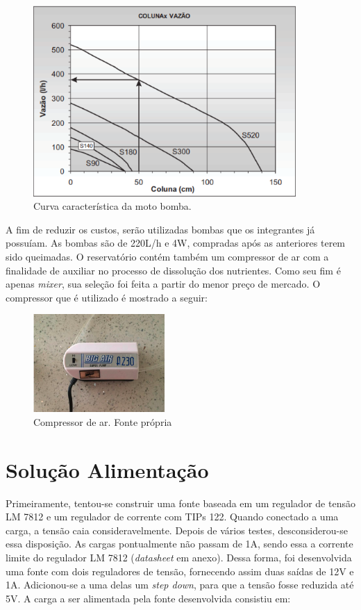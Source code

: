 \begin{figure}[H]
	\centering
	\includegraphics[width=10cm]{figuras/curva_moto.png}
	\caption{Curva característica da moto bomba.}
	\label{curva_moto}
\end{figure}

A fim de reduzir os custos, serão utilizadas bombas que os integrantes já possuíam. As bombas são de 220L/h e 4W, compradas após as anteriores terem sido queimadas.
O reservatório contém também um compressor de ar com a finalidade de auxiliar no processo de dissolução dos nutrientes. Como seu fim é apenas \textit{mixer}, sua seleção foi feita a partir do menor preço de mercado. O compressor que é utilizado é mostrado a seguir:


\begin{figure}[H]
	\centering
	\includegraphics[width=5cm]{figuras/compressor.png}
	\caption{Compressor de ar. Fonte própria}
	\label{compressor}
\end{figure}

\section{Solução Alimentação}

Primeiramente, tentou-se construir uma fonte baseada em um regulador de tensão LM 7812 e um regulador de corrente com TIPs 122. Quando conectado a uma carga, a tensão caia consideravelmente. Depois de vários testes, desconsiderou-se essa disposição. As cargas pontualmente não passam de 1A, sendo essa a corrente limite do regulador LM 7812 (\textit{datasheet} em anexo). Dessa forma, foi desenvolvida uma fonte com dois reguladores de tensão, fornecendo assim duas saídas de 12V e 1A. Adicionou-se a uma delas um \textit{step down}, para que a tensão fosse reduzida até 5V. A carga a ser alimentada pela fonte desenvolvida consistiu em:



